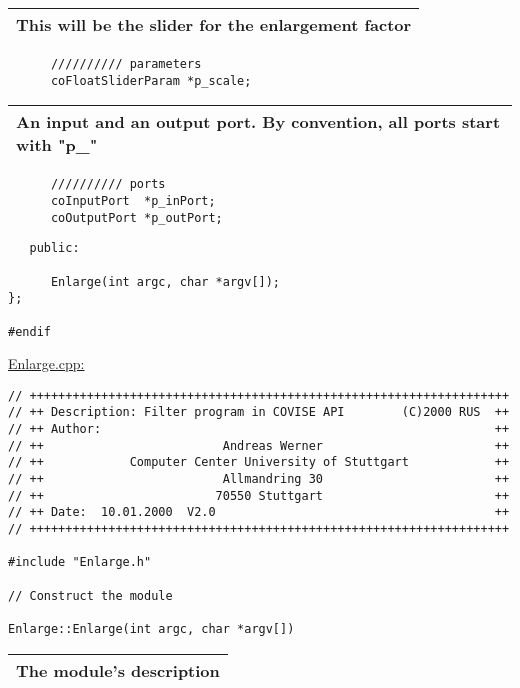 \begin{longtable}{|l|}
\hline
   {\bf This will be the slider for the enlargement factor} \\
\hline
\end{longtable}

\begin{verbatim}      
      ////////// parameters
      coFloatSliderParam *p_scale;
\end{verbatim}

\begin{longtable}{|l|}
\hline
   {\bf An input and an output port.     
   By convention, all ports start with "p\_"} \\
\hline
\end{longtable}

\begin{verbatim}     
      ////////// ports
      coInputPort  *p_inPort;
      coOutputPort *p_outPort;
\end{verbatim}

\begin{verbatim}          
   public:
 
      Enlarge(int argc, char *argv[]);
};
 
#endif
\end{verbatim}


\underline{Enlarge.cpp:}
\begin{verbatim}
// +++++++++++++++++++++++++++++++++++++++++++++++++++++++++++++++++++
// ++ Description: Filter program in COVISE API        (C)2000 RUS  ++
// ++ Author:                                                       ++
// ++                         Andreas Werner                        ++
// ++            Computer Center University of Stuttgart            ++
// ++                         Allmandring 30                        ++
// ++                        70550 Stuttgart                        ++
// ++ Date:  10.01.2000  V2.0                                       ++
// +++++++++++++++++++++++++++++++++++++++++++++++++++++++++++++++++++  
 
#include "Enlarge.h"
 
// Construct the module 
 
Enlarge::Enlarge(int argc, char *argv[])
\end{verbatim}

\begin{longtable}{|l|}
\hline
   {\bf The module's description} \\
\hline
\end{longtable}

